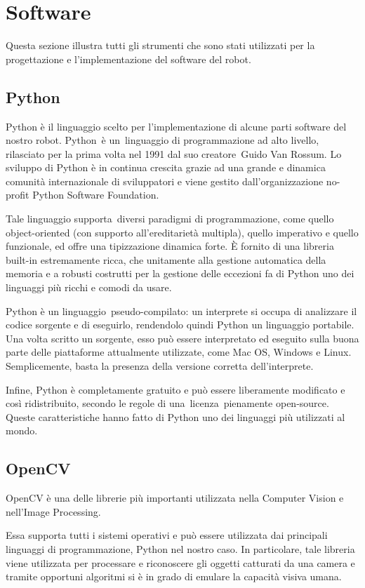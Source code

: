 \documentclass[a4paper,12pt,italian]{article}
\begin{document}
\pagebreak
\section{Software}
Questa sezione illustra tutti gli strumenti che sono stati utilizzati per la progettazione e l'implementazione del software del robot.

\subsection{Python}
Python è il linguaggio scelto per l'implementazione di alcune parti software del nostro robot.
Python è un linguaggio di programmazione ad alto livello, rilasciato per la prima volta nel 1991 dal suo creatore Guido Van Rossum. Lo sviluppo di Python è in continua crescita grazie ad una grande e dinamica comunità internazionale di sviluppatori e viene gestito dall'organizzazione no-profit Python Software Foundation. 

Tale linguaggio supporta diversi paradigmi di programmazione, come quello object-oriented (con supporto all'ereditarietà multipla), quello imperativo e quello funzionale, ed offre una tipizzazione dinamica forte. È fornito di una libreria built-in estremamente ricca, che unitamente alla gestione automatica della memoria e a robusti costrutti per la gestione delle eccezioni fa di Python uno dei linguaggi più ricchi e comodi da usare. 

Python è un linguaggio pseudo-compilato: un interprete si occupa di analizzare il codice sorgente e di eseguirlo, rendendolo quindi Python un linguaggio portabile. Una volta scritto un sorgente, esso può essere interpretato ed eseguito sulla buona parte delle piattaforme attualmente utilizzate, come Mac OS, Windows e Linux.  Semplicemente, basta la presenza della versione corretta dell'interprete. 

Infine, Python è completamente gratuito e può essere liberamente modificato e così ridistribuito, secondo le regole di una licenza pienamente open-source. Queste caratteristiche hanno fatto di Python uno dei linguaggi più utilizzati al mondo. 

\subsection{OpenCV}
OpenCV è una delle librerie più importanti utilizzata nella Computer Vision e nell’Image Processing.

Essa supporta tutti i sistemi operativi e può essere utilizzata dai principali linguaggi di programmazione, Python nel nostro caso. In particolare, tale libreria viene utilizzata per processare e riconoscere gli oggetti catturati da una camera e tramite opportuni algoritmi si è in grado di emulare la capacità visiva umana.
\end{document}
